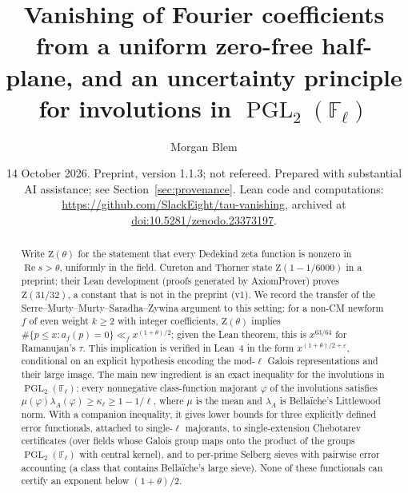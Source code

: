 \documentclass[11pt]{amsart}
\theoremstyle{definition}
\theoremstyle{remark}
\newcommand{\F}{\mathbb{F}}
\DeclareMathOperator{\PGL}{PGL}
\newcommand{\Zt}{\mathrm{Z}}       %
\begin{document}
\title[Vanishing of Fourier coefficients and involutions in $\PGL_2(\F_\ell)$]{Vanishing of Fourier coefficients from
a uniform zero-free half-plane, and an uncertainty principle for involutions in $\PGL_2(\F_\ell)$}

\author{Morgan Blem}

\date{14 October 2026. Preprint, version 1.1.3; not refereed. Prepared with substantial AI assistance; see
Section~\ref{sec:provenance}. Lean code and computations: \url{https://github.com/SlackEight/tau-vanishing},
archived at \href{https://doi.org/10.5281/zenodo.23373197}{doi:10.5281/zenodo.23373197}.}

\begin{abstract}
Write $\Zt(\theta)$ for the statement that every Dedekind zeta function is nonzero in $\operatorname{Re}s>\theta$,
uniformly in the field. Cureton and Thorner state $\Zt(1-1/6000)$ in a preprint; their Lean development (proofs
generated by AxiomProver) proves $\Zt(31/32)$, a constant that is not in the preprint (v1). We record the transfer of the Serre--Murty--Murty--Saradha--Zywina argument to this setting:
for a non-CM newform $f$ of even weight $k\ge2$ with integer coefficients, $\Zt(\theta)$ implies
$\#\{p\le x:a_f(p)=0\}\ll_f x^{(1+\theta)/2}$; given the Lean theorem, this is $x^{63/64}$ for Ramanujan's $\tau$.
This implication is verified in Lean~4 in the form $x^{(1+\theta)/2+\varepsilon}$, conditional on an explicit
hypothesis encoding the mod-$\ell$ Galois representations and their large image. The main new ingredient is an exact
inequality for the involutions in $\PGL_2(\F_\ell)$: every nonnegative class-function majorant $\varphi$ of the involutions
satisfies $\mu(\varphi)\lambda_A(\varphi)\ge\kappa_\ell\ge1-1/\ell$, where $\mu$ is the mean and $\lambda_A$ is
Bella\"iche's Littlewood norm. With a companion inequality, it gives lower bounds for three explicitly defined error
functionals, attached to single-$\ell$ majorants, to single-extension Chebotarev certificates (over fields whose
Galois group maps onto the product of the groups $\PGL_2(\F_\ell)$ with central kernel), and to per-prime Selberg sieves with pairwise error accounting (a class that contains Bella\"iche's large sieve). None of these
functionals can certify an exponent below $(1+\theta)/2$.
\end{abstract}

\maketitle
\end{document}
